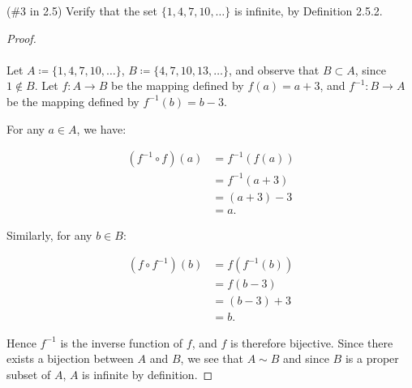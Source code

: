 (\#3 in 2.5) Verify that the set $\{1,4,7,10,\ldots\}$ is infinite, by
Definition 2.5.2.

\begin{proof}\ \\\\
    Let $A \coloneqq \{1, 4, 7, 10, \ldots\}$, 
    $B \coloneqq \{4, 7, 10, 13, \ldots\}$, and observe that $B \subset A$,
    since $1 \notin B$. Let $f:A \to B$ be the mapping defined by
    $f(a) = a + 3$, and $f^{-1}:B \to A$ be the mapping defined by
    $f^{-1}{(b)} = b - 3$.

    For any $a \in A$, we have:

    \begin{align*}
        (f^{-1} \circ f)(a) &= f^{-1}{\left(f(a)\right)} \\
                            &= f^{-1}{\left(a + 3\right)} \\
                            &= (a + 3) - 3 \\
                            &= a.
    \end{align*}

    Similarly, for any $b \in B$:

    \begin{align*}
        (f \circ f^{-1})(b) &= f\left(f^{-1}{(b)}\right) \\
                            &= f\left(b - 3\right) \\
                            &= (b - 3) + 3 \\
                            &= b.
    \end{align*}

    Hence $f^{-1}$ is the inverse function of $f$, and $f$ is therefore
    bijective. Since there exists a bijection between $A$ and $B$, we see that
    $A \sim B$ and since $B$ is a proper subset of $A$, $A$ is infinite by
    definition.
\end{proof}